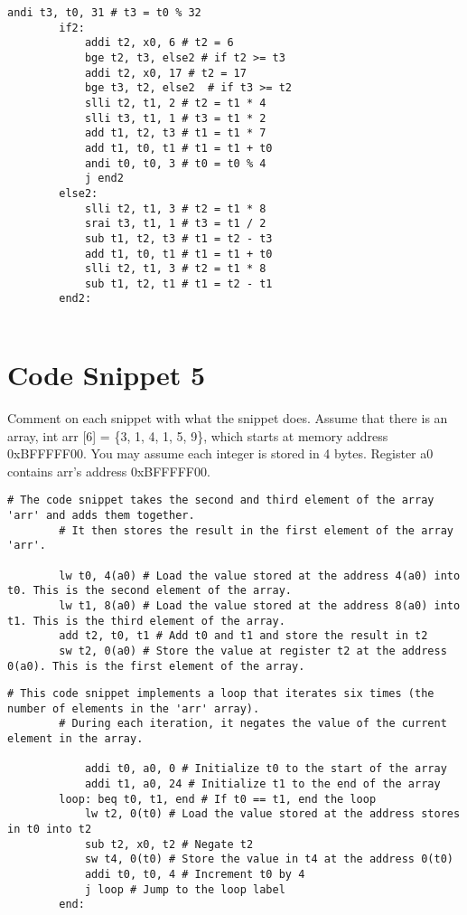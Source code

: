 \documentclass[12pt]{article}
\begin{document}
    \begin{lstlisting}[language=RISCV]
        andi t3, t0, 31 # t3 = t0 % 32
        if2:
            addi t2, x0, 6 # t2 = 6 
            bge t2, t3, else2 # if t2 >= t3
            addi t2, x0, 17 # t2 = 17
            bge t3, t2, else2  # if t3 >= t2
            slli t2, t1, 2 # t2 = t1 * 4
            slli t3, t1, 1 # t3 = t1 * 2
            add t1, t2, t3 # t1 = t1 * 7
            add t1, t0, t1 # t1 = t1 + t0
            andi t0, t0, 3 # t0 = t0 % 4
            j end2
        else2:
            slli t2, t1, 3 # t2 = t1 * 8
            srai t3, t1, 1 # t3 = t1 / 2
            sub t1, t2, t3 # t1 = t2 - t3
            add t1, t0, t1 # t1 = t1 + t0
            slli t2, t1, 3 # t2 = t1 * 8
            sub t1, t2, t1 # t1 = t2 - t1
        end2:
        
    \end{lstlisting}

    \newpage
    \section{Code Snippet 5}
    \begin{flushleft}
        Comment on each snippet with what the snippet does. Assume that there is an
        array, int arr [6] = \{3, 1, 4, 1, 5, 9\}, which starts at memory address
        0xBFFFFF00. You may assume each integer is stored in 4 bytes. Register a0 contains
        arr's address 0xBFFFFF00.
    \end{flushleft}
    \begin{lstlisting}[language=RISCV]
        # The code snippet takes the second and third element of the array 'arr' and adds them together.
        # It then stores the result in the first element of the array 'arr'.

        lw t0, 4(a0) # Load the value stored at the address 4(a0) into t0. This is the second element of the array.
        lw t1, 8(a0) # Load the value stored at the address 8(a0) into t1. This is the third element of the array.
        add t2, t0, t1 # Add t0 and t1 and store the result in t2
        sw t2, 0(a0) # Store the value at register t2 at the address 0(a0). This is the first element of the array.
    \end{lstlisting}

    \begin{lstlisting}[language=RISCV]
        # This code snippet implements a loop that iterates six times (the number of elements in the 'arr' array). 
        # During each iteration, it negates the value of the current element in the array.

            addi t0, a0, 0 # Initialize t0 to the start of the array
            addi t1, a0, 24 # Initialize t1 to the end of the array
        loop: beq t0, t1, end # If t0 == t1, end the loop
            lw t2, 0(t0) # Load the value stored at the address stores in t0 into t2
            sub t2, x0, t2 # Negate t2
            sw t4, 0(t0) # Store the value in t4 at the address 0(t0)
            addi t0, t0, 4 # Increment t0 by 4
            j loop # Jump to the loop label
        end:
    \end{lstlisting}
\end{document}
